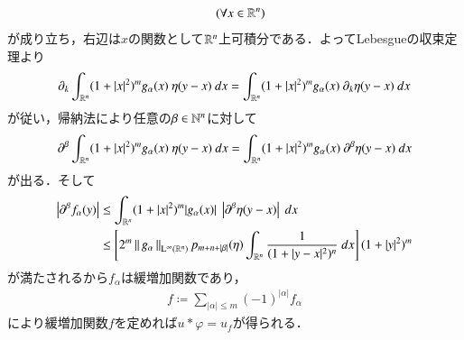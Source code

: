 \begin{prf}
\begin{description}
\begin{align}
				\quad (\forall x \in \mathbb{R}^n)
			\end{align}
			が成り立ち，右辺は$x$の関数として$\mathbb{R}^n$上可積分である．よってLebesgueの収束定理より
			\begin{align}
				\partial_k \int_{\R^n} (1+|x|^2)^m g_\alpha(x)\ \eta(y-x)\ dx
				= \int_{\R^n} (1+|x|^2)^m g_\alpha(x)\ \partial_k \eta(y-x)\ dx
			\end{align}
			が従い，帰納法により任意の$\beta \in \mathbb{N}^n$に対して
			\begin{align}
				\partial^\beta \int_{\R^n} (1+|x|^2)^m g_\alpha(x)\ \eta(y-x)\ dx
				= \int_{\R^n} (1+|x|^2)^m g_\alpha(x)\ \partial^\beta \eta(y-x)\ dx
			\end{align}
			が出る．そして
			\begin{align}
				\left| \partial^\beta f_\alpha(y) \right|
				&\leq \int_{\mathbb{R}^n} (1+|x|^2)^m |g_\alpha(x)|\ \left| \partial^\beta \eta(y-x) \right|\ dx \\
				&\leq \left[2^m \left\|\, g_\alpha\, \right\|_{\mathrm{L}^\infty(\mathbb{R}^n)} p_{m+n+|\beta|}(\eta) \int_{\mathbb{R}^n} \frac{1}{(1+|y-x|^2)^n}\ dx \right] (1+|y|^2)^m
			\end{align}
			が満たされるから$f_\alpha$は緩増加関数であり，
			\begin{align}
				f \coloneqq \sum_{|\alpha| \leq m} (-1)^{|\alpha|} f_\alpha
			\end{align}
			により緩増加関数$f$を定めれば$u \ast \varphi = u_f$が得られる．
			\QED
		\end{description}
	\end{prf}